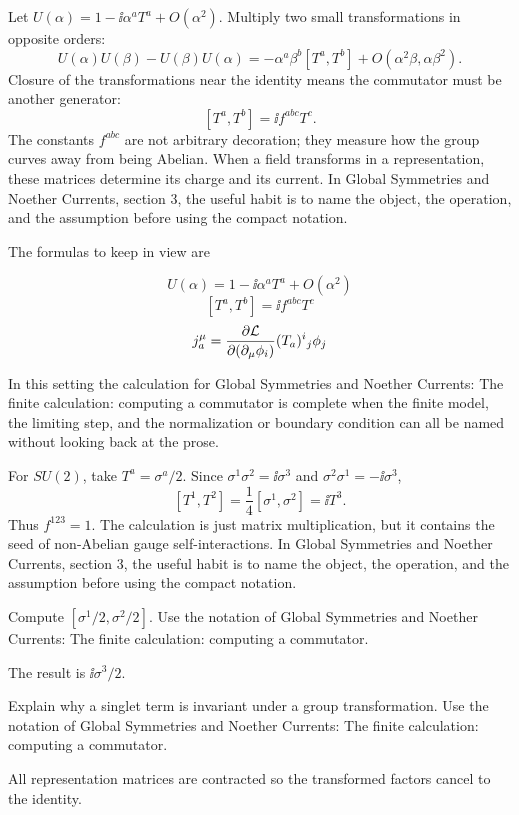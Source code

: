 Let \(U(\alpha)=1-\ii\alpha^aT^a+O(\alpha^2)\).  Multiply two small transformations in opposite orders:
\[
  U(\alpha)U(\beta)-U(\beta)U(\alpha)
  =
  -\alpha^a\beta^b[T^a,T^b]+O(\alpha^2\beta,\alpha\beta^2).
\]
Closure of the transformations near the identity means the commutator must be another generator:
\[
  [T^a,T^b]=\ii f^{abc}T^c.
\]
The constants \(f^{abc}\) are not arbitrary decoration; they measure how the group curves away from being Abelian.  When a field transforms in a representation, these matrices determine its charge and its current.  In Global Symmetries and Noether Currents, section 3, the useful habit is to name the object, the operation, and the assumption before using the compact notation.

The formulas to keep in view are

\[
  U(\alpha)=1-\ii\alpha^aT^a+O(\alpha^2)
\]
\[
  [T^a,T^b]=\ii f^{abc}T^c
\]
\[
  j^\mu_a=\frac{\partial\mathcal L}{\partial(\partial_\mu\phi_i)}(T_a)^i{}_j\phi_j
\]

In this setting the calculation for Global Symmetries and Noether Currents: The finite calculation: computing a commutator is complete when the finite model, the limiting step, and the normalization or boundary condition can all be named without looking back at the prose.




\begin{example}
For \(SU(2)\), take \(T^a=\sigma^a/2\).  Since \(\sigma^1\sigma^2=\ii\sigma^3\) and \(\sigma^2\sigma^1=-\ii\sigma^3\),
\[
  [T^1,T^2]=\frac14[\sigma^1,\sigma^2]=\ii T^3.
\]
Thus \(f^{123}=1\).  The calculation is just matrix multiplication, but it contains the seed of non-Abelian gauge self-interactions.  In Global Symmetries and Noether Currents, section 3, the useful habit is to name the object, the operation, and the assumption before using the compact notation.
\end{example}



\begin{exercise}
Compute \([\sigma^1/2,\sigma^2/2]\).  Use the notation of Global Symmetries and Noether Currents: The finite calculation: computing a commutator.
\begin{answer}
The result is \(\ii\sigma^3/2\).
\end{answer}
\end{exercise}

\begin{exercise}
Explain why a singlet term is invariant under a group transformation.  Use the notation of Global Symmetries and Noether Currents: The finite calculation: computing a commutator.
\begin{answer}
All representation matrices are contracted so the transformed factors cancel to the identity.
\end{answer}
\end{exercise}



